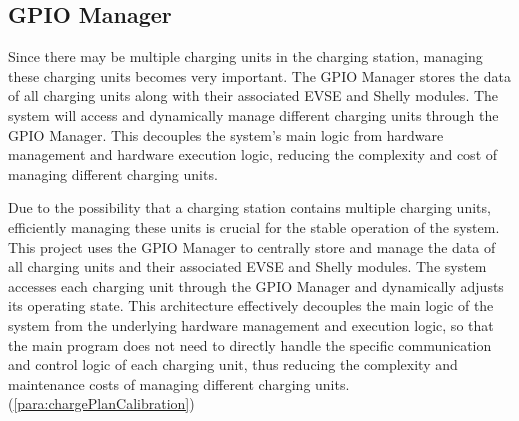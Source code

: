 \documentclass[
english,
ruledheaders=section,%
class=report,%
thesis={type=Report},%
accentcolor=9c,%
custommargins=true,%
marginpar=false,%
parskip=half-,%
fontsize=11pt,%
logofile={img/tuda_logo.pdf}, %
]{tudapub}
\begin{document}


    \subsection{GPIO Manager}
    \label{sec:GPIOManager}
    Since there may be multiple charging units in the charging station, managing these charging units becomes very important. The GPIO Manager stores the data of all charging units along with their associated EVSE and Shelly modules. The system will access and dynamically manage different charging units through the GPIO Manager. This decouples the system's main logic from hardware management and hardware execution logic, reducing the complexity and cost of managing different charging units.

    Due to the possibility that a charging station contains multiple charging units, efficiently managing these units is crucial for the stable operation of the system. This project uses the GPIO Manager to centrally store and manage the data of all charging units and their associated EVSE and Shelly modules. The system accesses each charging unit through the GPIO Manager and dynamically adjusts its operating state. This architecture effectively decouples the main logic of the system from the underlying hardware management and execution logic, so that the main program does not need to directly handle the specific communication and control logic of each charging unit, thus reducing the complexity and maintenance costs of managing different charging units.
    (\ref{para:chargePlanCalibration})
\end{document}
